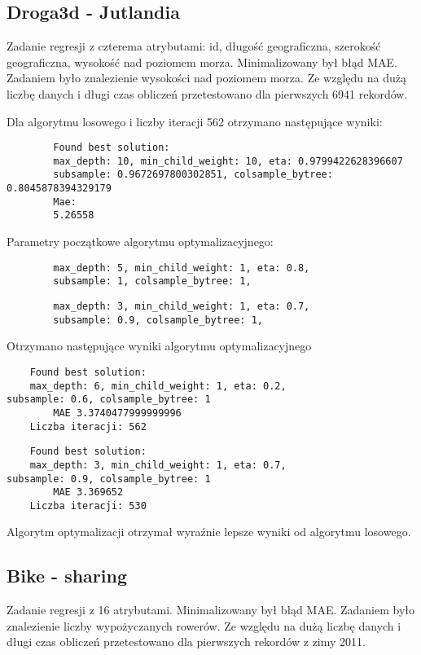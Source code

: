 \documentclass[a4paper,12p]{article}
\begin{document}
	\subsection{Droga3d - Jutlandia}
	Zadanie regresji z czterema atrybutami: id, długość geograficzna, szerokość geograficzna, wysokość nad poziomem morza. Minimalizowany był błąd MAE. Zadaniem było znalezienie wysokości nad poziomem morza. Ze względu na dużą liczbę danych i długi czas obliczeń przetestowano dla pierwszych 6941 rekordów.
	
	
	Dla algorytmu losowego i liczby iteracji 562 otrzymano następujące wyniki: 
	
	\begin{verbatim} 
		Found best solution:
		max_depth: 10, min_child_weight: 10, eta: 0.9799422628396607 
		subsample: 0.9672697800302851, colsample_bytree: 0.8045878394329179
		Mae: 
		5.26558
	\end{verbatim}
	
	Parametry początkowe algorytmu optymalizacyjnego:
	\begin{verbatim}
		max_depth: 5, min_child_weight: 1, eta: 0.8,
		subsample: 1, colsample_bytree: 1,
	\end{verbatim}
	\begin{verbatim}
		max_depth: 3, min_child_weight: 1, eta: 0.7,
		subsample: 0.9, colsample_bytree: 1,
	\end{verbatim}
	
	Otrzymano następujące wyniki algorytmu optymalizacyjnego
	\begin{verbatim}
	Found best solution:
	max_depth: 6, min_child_weight: 1, eta: 0.2,
subsample: 0.6, colsample_bytree: 1
        MAE 3.3740477999999996 
	Liczba iteracji: 562
	\end{verbatim}
	
	\begin{verbatim}
	Found best solution:
	max_depth: 3, min_child_weight: 1, eta: 0.7,
subsample: 0.9, colsample_bytree: 1
        MAE 3.369652
	Liczba iteracji: 530
	\end{verbatim}
	
	Algorytm optymalizacji otrzymał wyraźnie lepsze wyniki od algorytmu losowego.
	
	\subsection{Bike - sharing}
	Zadanie regresji z 16 atrybutami. Minimalizowany był błąd MAE. Zadaniem było znalezienie liczby wypożyczanych rowerów. Ze względu na dużą liczbę danych i długi czas obliczeń przetestowano dla pierwszych rekordów z zimy 2011.
\end{document}
